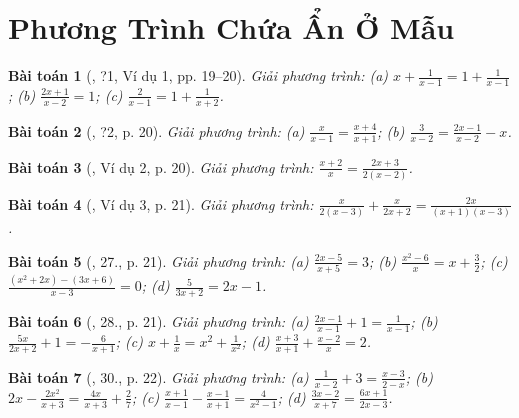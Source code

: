 \documentclass{article}
\newtheorem{baitoan}{Bài toán}
\begin{document}

\section{Phương Trình Chứa Ẩn Ở Mẫu}

\begin{baitoan}[\cite{SGK_Toan_8_tap_2}, ?1, Ví dụ 1, pp. 19--20]
	Giải phương trình: (a) $x + \frac{1}{x - 1} = 1 + \frac{1}{x - 1}$; (b) $\frac{2x + 1}{x - 2} = 1$; (c) $\frac{2}{x - 1} = 1 + \frac{1}{x + 2}$.
\end{baitoan}

\begin{baitoan}[\cite{SGK_Toan_8_tap_2}, ?2, p. 20]
	Giải phương trình: (a) $\frac{x}{x - 1} = \frac{x + 4}{x + 1}$; (b) $\frac{3}{x - 2} = \frac{2x - 1}{x - 2} - x$.
\end{baitoan}

\begin{baitoan}[\cite{SGK_Toan_8_tap_2}, Ví dụ 2, p. 20]
	Giải phương trình: $\frac{x + 2}{x} = \frac{2x + 3}{2(x - 2)}$.
\end{baitoan}

\begin{baitoan}[\cite{SGK_Toan_8_tap_2}, Ví dụ 3, p. 21]
	Giải phương trình: $\frac{x}{2(x - 3)} + \frac{x}{2x + 2} = \frac{2x}{(x + 1)(x - 3)}$.
\end{baitoan}

\begin{baitoan}[\cite{SGK_Toan_8_tap_2}, 27., p. 21]
	Giải phương trình: (a) $\frac{2x - 5}{x + 5} = 3$; (b) $\frac{x^2 - 6}{x} = x + \frac{3}{2}$; (c) $\frac{(x^2 + 2x) - (3x + 6)}{x - 3} = 0$; (d) $\frac{5}{3x + 2} = 2x - 1$.
\end{baitoan}

\begin{baitoan}[\cite{SGK_Toan_8_tap_2}, 28., p. 21]
	Giải phương trình: (a) $\frac{2x - 1}{x - 1} + 1 = \frac{1}{x - 1}$; (b) $\frac{5x}{2x + 2} + 1 = -\frac{6}{x + 1}$; (c) $x + \frac{1}{x} = x^2 + \frac{1}{x^2}$; (d) $\frac{x + 3}{x + 1} + \frac{x - 2}{x} = 2$.
\end{baitoan}

\begin{baitoan}[\cite{SGK_Toan_8_tap_2}, 30., p. 22]
	Giải phương trình: (a) $\frac{1}{x - 2} + 3 = \frac{x - 3}{2 - x}$; (b) $2x - \frac{2x^2}{x + 3} = \frac{4x}{x + 3} + \frac{2}{7}$; (c) $\frac{x + 1}{x - 1} - \frac{x - 1}{x + 1} = \frac{4}{x^2 - 1}$; (d) $\frac{3x - 2}{x + 7} = \frac{6x + 1}{2x - 3}$.
\end{baitoan}
\end{document}
